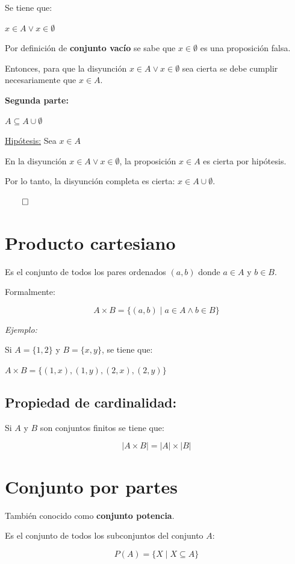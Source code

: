 \documentclass{article}
\begin{document}
Se tiene que:

$x \in A \lor x \in \emptyset$

Por definición de \textbf{conjunto vacío} se sabe que $x \in \emptyset$ es una proposición falsa.

Entonces, para que la disyunción $x \in A \lor x \in \emptyset$ sea cierta se debe cumplir necesariamente que $x \in A$.

\textbf{Segunda parte:} 

$A \subseteq A \cup \emptyset$

\underline{Hipótesis:} Sea $x \in A$

En la disyunción $x \in A \lor x \in \emptyset$, la proposición $x \in A$ es cierta por hipótesis.

Por lo tanto, la disyunción completa es cierta: $x \in A \cup \emptyset$.

$\qed$

\section{Producto cartesiano}

Es el conjunto de todos los pares ordenados $(a, b)$ donde $a \in A$ y $b \in B$.

Formalmente: 

\[A \times B = \{(a,b) \mid a \in A \land b \in B \}\]

\textit{Ejemplo:}

Si $A = \{1, 2\}$ y $B = \{x, y\}$, se tiene que:

$A \times B = \{ (1, x), (1, y), (2, x), (2, y) \}$

\subsection{Propiedad de cardinalidad:}

Si $A$ y $B$ son conjuntos finitos se tiene que:

\[ \left|A \times B\right| = \left|A\right| \times \left|B\right| \]

\section{Conjunto por partes}

También conocido como \textbf{conjunto potencia}. 

Es el conjunto de todos los subconjuntos del conjunto $A$:
 
\[ P(A) = \{X \mid X \subseteq A \} \]
\end{document}
